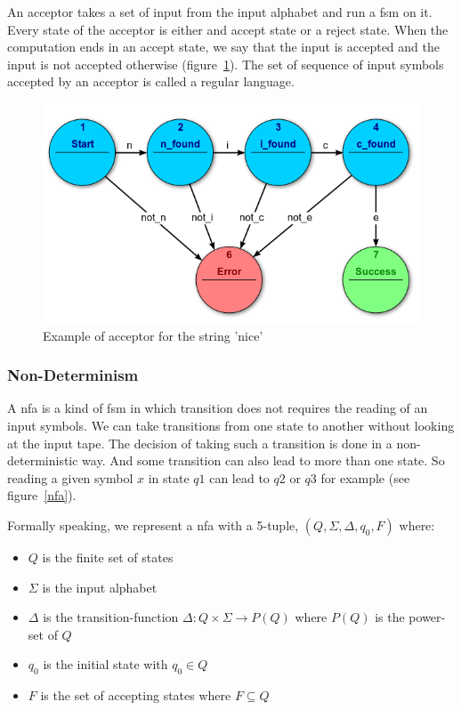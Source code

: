 \documentclass[12pt]{article}
\begin{document}
An acceptor takes a set of input from the input alphabet and run a \gls{fsm} on it. Every state of the acceptor is either and accept state or a reject state. When the computation ends in an accept state, we say that the input is accepted and the input is not accepted otherwise (figure~\ref{acceptor}). The set of sequence of input symbols accepted by an acceptor is called a regular language.\\

\begin{figure}
    \centering
    \includegraphics[scale=0.8]{acceptor.png}
    \caption{Example of acceptor for the string 'nice'~\cite{FSM:2017}}
    \label{acceptor}
\end{figure}

\subsubsection{Non-Determinism}

A \gls{nfa} is a kind of \gls{fsm} in which transition does not requires the reading of an input symbols. We can take transitions from one state to another without looking at the input tape. The decision of taking such a transition is done in a non-deterministic way. And some transition can also lead to more than one state. So reading a given symbol $x$ in state $q1$ can lead to $q2$ or $q3$ for example (see figure~\ref{nfa}).~\cite{FA-DecisionProblems:1959}

Formally speaking, we represent a \gls{nfa} with a 5-tuple, $(Q, \Sigma, \Delta, q_0, F)$ where:

\begin{itemize}
\item $Q$ is the finite set of states
\item $\Sigma$ is the input alphabet
\item $\Delta$ is the transition-function $\Delta: Q \times \Sigma \rightarrow P(Q)$ where $P(Q)$ is the power-set of $Q$
\item $q_0$ is the initial state with $q_0 \in Q$
\item $F$ is the set of accepting states where $F \subseteq Q$
\end{itemize}
\end{document}
